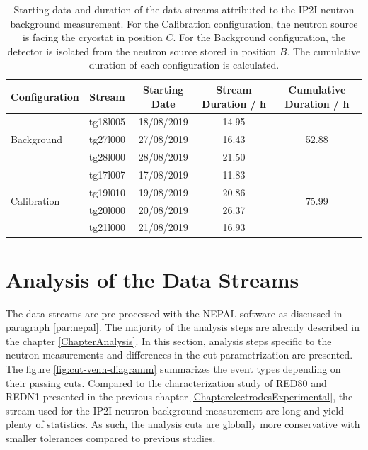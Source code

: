 \begin{table}[]
\centering
\begin{tabular}{l|c|c|c|c}
Configuration                & Stream   & Starting Date & Stream Duration / \si{ \hour} & Cumulative Duration / \si{ \hour}  \\ \hline \hline
\multirow{3}{*}{Background}  & tg18l005 & 18/08/2019  & 14.95 & \multirow{3}{*}{52.88}\\
                             & tg27l000 & 27/08/2019 & 16.43 & \\
                             & tg28l000 & 28/08/2019 & 21.50 & \\ \hline
\multirow{4}{*}{Calibration} & tg17l007 & 17/08/2019 & 11.83 & \multirow{4}{*}{75.99} \\
                             & tg19l010 & 19/08/2019 & 20.86 &\\
                             & tg20l000 & 20/08/2019 & 26.37  & \\
                             & tg21l000 & 21/08/2019 & 16.93  &
\end{tabular}
\caption{Starting data and duration of the data streams attributed to the IP2I neutron background measurement. For the Calibration configuration, the neutron source is facing the cryostat in position $C$. For the Background configuration, the detector is isolated from the neutron source stored in position $B$. The cumulative duration of each configuration is calculated.}
\label{tab:neutron-streams}
\end{table}


\section{Analysis of the Data Streams}
\label{par:analysis-data-streams}

The data streams are pre-processed with the NEPAL software as discussed in paragraph \ref{par:nepal}. The majority of the analysis steps are already described in the chapter \ref{ChapterAnalysis}. 
In this section, analysis steps specific to the neutron measurements and differences in the cut parametrization are presented. The figure \ref{fig:cut-venn-diagramm} summarizes the event types depending on their passing cuts.
Compared to the characterization study of RED80 and REDN1 presented in the previous chapter \ref{ChapterelectrodesExperimental}, the stream used for the IP2I neutron background measurement are long and yield plenty of statistics. As such, the analysis cuts are globally more conservative with smaller tolerances compared to previous studies. 

